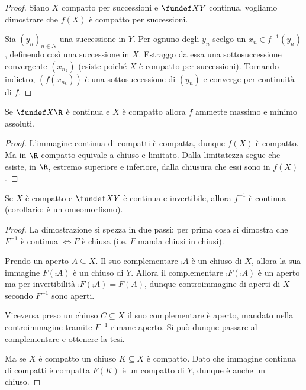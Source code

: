 \begin{proof}
	Siano $X$ compatto per successioni e $\fundef XY$ continua, vogliamo dimostrare che $f(X)$ è compatto per successioni.
	
	Sia $(y_n)_{n\in N}$ una successione in $Y$. Per ognuno degli $y_n$ scelgo un $x_n\in f^{-1}(y_n)$, definendo così una successione in $X$.
	Estraggo da essa una sottosuccessione convergente $(x_{n_k})$ (esiste poiché $X$ è compatto per successioni).
	Tornando indietro, $(f(x_{n_k}))$ è una sottosuccessione di $(y_n)$ e converge per continuità di $f$.
\end{proof}

\begin{lemma}
	Se $\fundef X\R$ è continua e $X$ è compatto allora $f$ ammette massimo e minimo assoluti.
\end{lemma}

\begin{proof}
	L'immagine continua di compatti è compatta, dunque $f(X)$ è compatto. Ma in $\R$ compatto equivale a chiuso e limitato. Dalla limitatezza segue che esiste, in $\R$, estremo superiore e inferiore, dalla chiusura che essi sono in $f(X)$.
\end{proof}

\begin{lemma}
	Se $X$ è compatto e  $\fundef XY$ è continua e invertibile, allora $f^{-1}$ è continua (corollario: è un omeomorfismo).
\end{lemma}

\begin{proof}
	La dimostrazione si spezza in due passi:
	per prima cosa si dimostra che $F^{-1}$ è continua $\iff F$ è chiusa (i.e. $F$ manda chiusi in chiusi).

	Prendo un aperto $A\subseteq X$. Il suo complementare $\comp A$ è un chiuso di $X$, allora la sua immagine $F(\comp A)$ è un chiuso di $Y$. Allora il complementare  $\comp{F(\comp A)}$ è un aperto ma per invertibilità $\comp{F(\comp A)}=F(A)$, dunque controimmagine di aperti di $X$ secondo $F^{-1}$ sono aperti.

	Viceversa preso un chiuso $C \subseteq X$ il suo complementare è aperto, mandato nella controimmagine tramite $F^{-1}$ rimane aperto. Si può dunque passare al complementare e ottenere la tesi.

	Ma se $X$ è compatto un chiuso $K\subseteq X$ è compatto. Dato che immagine continua di compatti è compatta $F(K)$ è un compatto di $Y$, dunque è anche un chiuso.
\end{proof}

